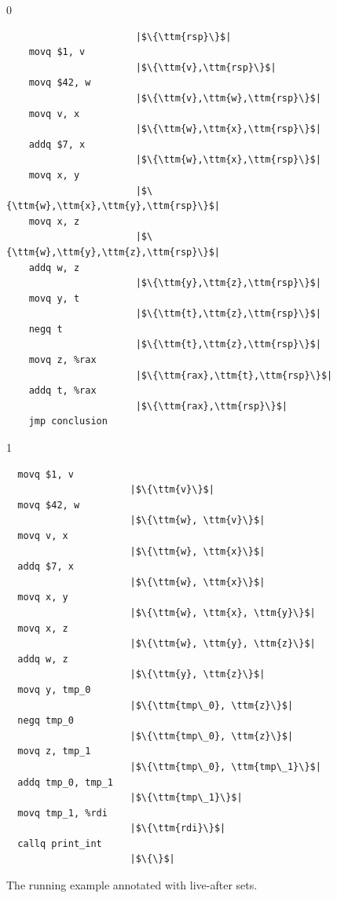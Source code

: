 \documentclass[7x10]{TimesAPriori_MIT}%
\def\racketEd{0}
\def\pythonEd{1}
\providecommand{\BookEdition}{1}
\let\edition\BookEdition
\newcommand{\pythonColor}[0]{}
\numberwithin{theorem}{chapter}
\numberwithin{definition}{chapter}
\numberwithin{equation}{chapter}
\begin{document}
\begin{figure}[tp]
\hspace{20pt}
\begin{minipage}{0.55\textwidth}
\begin{tcolorbox}[colback=white]
{\if\edition\racketEd
\begin{lstlisting}
                       |$\{\ttm{rsp}\}$|    
    movq $1, v
                       |$\{\ttm{v},\ttm{rsp}\}$|    
    movq $42, w
                       |$\{\ttm{v},\ttm{w},\ttm{rsp}\}$|    
    movq v, x
                       |$\{\ttm{w},\ttm{x},\ttm{rsp}\}$|    
    addq $7, x
                       |$\{\ttm{w},\ttm{x},\ttm{rsp}\}$|    
    movq x, y
                       |$\{\ttm{w},\ttm{x},\ttm{y},\ttm{rsp}\}$|    
    movq x, z
                       |$\{\ttm{w},\ttm{y},\ttm{z},\ttm{rsp}\}$|    
    addq w, z
                       |$\{\ttm{y},\ttm{z},\ttm{rsp}\}$|
    movq y, t
                       |$\{\ttm{t},\ttm{z},\ttm{rsp}\}$|    
    negq t
                       |$\{\ttm{t},\ttm{z},\ttm{rsp}\}$|    
    movq z, %rax
                       |$\{\ttm{rax},\ttm{t},\ttm{rsp}\}$|    
    addq t, %rax
                       |$\{\ttm{rax},\ttm{rsp}\}$|
    jmp conclusion
\end{lstlisting}
\fi}
{\if\edition\pythonEd\pythonColor
\begin{lstlisting}
  movq $1, v
                      |$\{\ttm{v}\}$|
  movq $42, w
                      |$\{\ttm{w}, \ttm{v}\}$|
  movq v, x
                      |$\{\ttm{w}, \ttm{x}\}$|
  addq $7, x
                      |$\{\ttm{w}, \ttm{x}\}$|
  movq x, y
                      |$\{\ttm{w}, \ttm{x}, \ttm{y}\}$|
  movq x, z
                      |$\{\ttm{w}, \ttm{y}, \ttm{z}\}$|
  addq w, z
                      |$\{\ttm{y}, \ttm{z}\}$|        
  movq y, tmp_0
                      |$\{\ttm{tmp\_0}, \ttm{z}\}$|
  negq tmp_0
                      |$\{\ttm{tmp\_0}, \ttm{z}\}$|
  movq z, tmp_1
                      |$\{\ttm{tmp\_0}, \ttm{tmp\_1}\}$|
  addq tmp_0, tmp_1
                      |$\{\ttm{tmp\_1}\}$|
  movq tmp_1, %rdi
                      |$\{\ttm{rdi}\}$|
  callq print_int
                      |$\{\}$|
\end{lstlisting}
\fi}
\end{tcolorbox}
\end{minipage}
\caption{The running example annotated with live-after sets.}
\label{fig:live-eg}
\end{figure}
\end{document}
